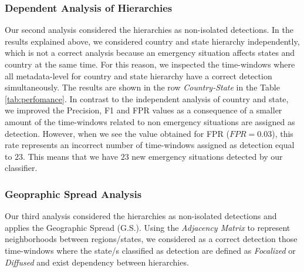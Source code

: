 \documentclass[sigconf]{acmart}
\begin{document}
\subsubsection{Dependent Analysis of Hierarchies}
Our second analysis considered the hierarchies as non-isolated detections. In the results explained above, we considered country and state hierarchy independently, which is not a correct analysis because an emergency situation affects states and country at the same time. For this reason, we inspected the time-windows where all metadata-level for country and state hierarchy have a correct detection simultaneously. The results are shown in the row \textit{Country-State} in the Table \ref{tab:perfomance}. In contrast to the independent analysis of country and state, we improved the Precision, F1 and FPR values as a consequence of a smaller amount of the time-windows related to non emergency situations are assigned as detection. However, when we see the value obtained for FPR ($FPR = 0.03$), this rate represents an incorrect number of time-windows assigned as detection equal to $23$. This means that we have $23$ new emergency situations detected by our classifier. 


\subsubsection{Geopraphic Spread Analysis}\label{sssec:geospreadanalysis}
Our third analysis considered the hierarchies as non-isolated detections and applies the Geographic Spread (G.S.). Using the \textit{Adjacency Matrix} to represent neighborhoods between regions/states, we considered as a correct detection those time-windows where the state/s classified as detection are defined as \textit{Focalized} or \textit{Diffused} and exist dependency between hierarchies. 
\end{document}
